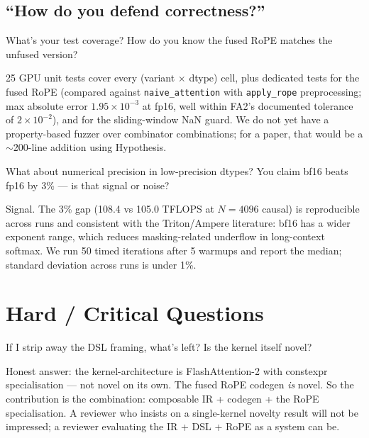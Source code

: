 \documentclass[11pt]{article}
\begin{document}
\subsection{``How do you defend correctness?''}

\begin{question}{What's your test coverage? How do you know the fused RoPE
matches the unfused version?}
\end{question}
\begin{answer}
25 GPU unit tests cover every (variant $\times$ dtype) cell, plus dedicated
tests for the fused RoPE (compared against \texttt{naive\_attention} with
\texttt{apply\_rope} preprocessing; max absolute error $1.95 \times 10^{-3}$
at fp16, well within FA2's documented tolerance of $2 \times 10^{-2}$),
and for the sliding-window NaN guard. We do not yet have a property-based
fuzzer over combinator combinations; for a paper, that would be a
$\sim$200-line addition using Hypothesis.
\end{answer}

\begin{question}{What about numerical precision in low-precision dtypes? You
claim bf16 beats fp16 by 3\% --- is that signal or noise?}
\end{question}
\begin{answer}
Signal. The 3\% gap (108.4 vs 105.0 TFLOPS at $N=4096$ causal) is
reproducible across runs and consistent with the Triton/Ampere literature:
bf16 has a wider exponent range, which reduces masking-related underflow
in long-context softmax. We run 50 timed iterations after 5 warmups and
report the median; standard deviation across runs is under 1\%.
\end{answer}

\section{Hard / Critical Questions}

\begin{question}{If I strip away the DSL framing, what's left? Is the kernel
itself novel?}
\end{question}
\begin{answer}
Honest answer: the kernel-architecture is FlashAttention-2 with constexpr
specialisation --- not novel on its own. The fused RoPE codegen \emph{is}
novel. So the contribution is the combination: composable IR + codegen +
the RoPE specialisation. A reviewer who insists on a single-kernel novelty
result will not be impressed; a reviewer evaluating the IR + DSL + RoPE as
a system can be.
\end{answer}
\end{document}
